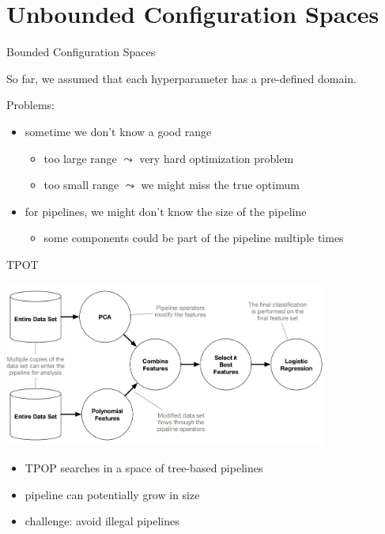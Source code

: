 \section{Unbounded Configuration Spaces}
\begin{frame}[c]{Bounded Configuration Spaces}

So far, we assumed that each hyperparameter has a pre-defined domain.

\medskip
Problems:
\begin{itemize}
  \item sometime we don't know a good range
  \begin{itemize}
     \item too large range $\leadsto$ very hard optimization problem
     \item too small range $\leadsto$ we might miss the true optimum
  \end{itemize}
  \pause
  \medskip
  \item for pipelines, we might don't know the size of the pipeline
  \begin{itemize}
    \item some components could be part of the pipeline multiple times
  \end{itemize}
\end{itemize}

\end{frame}
\begin{frame}[c]{TPOT }

\centering
\includegraphics[width=0.8\textwidth]{images/tpot_tree}

\begin{itemize}
  \item TPOP searches in a space of tree-based pipelines
  \item pipeline can potentially grow in size
  \item challenge: avoid illegal pipelines
\end{itemize}

\end{frame}
